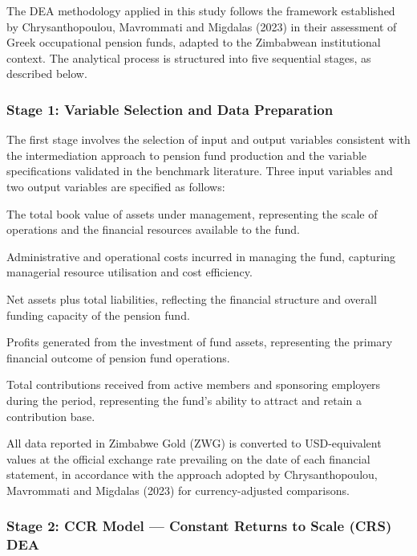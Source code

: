 \documentclass[12pt,a4paper]{article}
\begin{document}
The DEA methodology applied in this study follows the framework established by Chrysanthopoulou, Mavrommati and Migdalas (2023) in their assessment of Greek occupational pension funds, adapted to the Zimbabwean institutional context. The analytical process is structured into five sequential stages, as described below.

\subsubsection{Stage 1: Variable Selection and Data Preparation}

The first stage involves the selection of input and output variables consistent with the intermediation approach to pension fund production and the variable specifications validated in the benchmark literature. Three input variables and two output variables are specified as follows:

\begin{description}[noitemsep]
    \item[Input 1 --- Total Assets ($x_1$):] The total book value of assets under management, representing the scale of operations and the financial resources available to the fund.
    \item[Input 2 --- Total Operating Expenses ($x_2$):] Administrative and operational costs incurred in managing the fund, capturing managerial resource utilisation and cost efficiency.
    \item[Input 3 --- Total Equity and Debt ($x_3$):] Net assets plus total liabilities, reflecting the financial structure and overall funding capacity of the pension fund.
    \item[Output 1 --- Net Investment Income ($y_1$):] Profits generated from the investment of fund assets, representing the primary financial outcome of pension fund operations.
    \item[Output 2 --- Members' Contributions ($y_2$):] Total contributions received from active members and sponsoring employers during the period, representing the fund's ability to attract and retain a contribution base.
\end{description}

All data reported in Zimbabwe Gold (ZWG) is converted to USD-equivalent values at the official exchange rate prevailing on the date of each financial statement, in accordance with the approach adopted by Chrysanthopoulou, Mavrommati and Migdalas (2023) for currency-adjusted comparisons.

\subsubsection{Stage 2: CCR Model --- Constant Returns to Scale (CRS) DEA}
\end{document}

